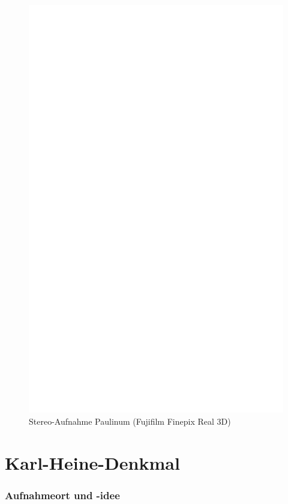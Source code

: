 \documentclass[liststotoc,bibtotoc,fontsize=14pt,]{scrreprt}
\begin{document}
		\newpage
		\begin{figure}[h]
			\includegraphics[width=\linewidth]{img/ph.jpg}
			\caption{Stereo-Aufnahme Paulinum (Fujifilm Finepix Real 3D)}
		\end{figure}

\section{Karl-Heine-Denkmal}
\label{sec:palme}
\subsubsection{Aufnahmeort und -idee}
\end{document}
